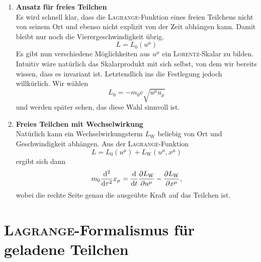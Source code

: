 \begin{enumerate}
\item \textbf{ Ansatz für freies Teilchen}\\

Es wird schnell klar, dass die \textsc{Lagrange}-Funktion eines freien Teilchens nicht von seinem Ort und ebenso nicht explizit von der Zeit abhängen kann. Damit bleibt nur noch die Vierergeschwindigkeit übrig.
\begin{equation*}
L = L_0 \left(u^\mu \right)
\end{equation*}
Es gibt nun verschiedene Möglichkeiten aus $u^\mu$ ein \textsc{Lorentz}-Skalar zu bilden. Intuitiv wäre natürlich das Skalarprodukt mit sich selbst, von dem wir bereits wissen, dass es invariant ist. Letztendlich ins die Festlegung jedoch willkürlich. Wir wählen
\begin{equation*}
L_0 = -m_0c\sqrt{u^\mu u_\mu}
\end{equation*}
und werden später sehen, das diese Wahl sinnvoll ist.\\

\item \textbf{ Freies Teilchen mit Wechselwirkung}\\

Natürlich kann ein Wechselwirkungsterm $L_\text{W}$ beliebig von Ort und Geschwindigkeit abhängen. Aus der \textsc{Lagrange}-Funktion 
\begin{equation*}
L = L_0\left(u^\mu \right) + L_\text{W}\left(u^\mu,x^\mu\right)
\end{equation*}
ergibt sich dann
\begin{align*}
m_0 \frac{\mathrm{d}^2{}}{\mathrm{d}{\tau}^2} x_\mu = \frac{\mathrm{d}{}}{\mathrm{d}{t}}\frac{\partial{L_\text{W}}}{\partial{u^\mu}}-\frac{\partial{L_\text{W}}}{\partial{x^\mu}},
\end{align*}
wobei die rechte Seite genau die ausgeübte Kraft auf das Teilchen ist.
\end{enumerate}

\section[\textsc{Lagrange}: geladene Teilchen]{\textsc{Lagrange}-Formalismus für geladene Teilchen}

